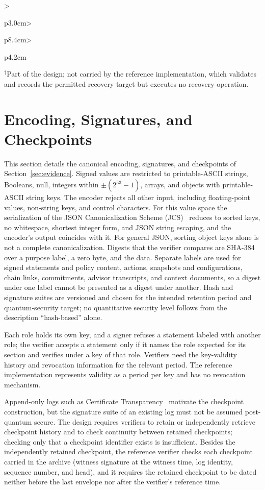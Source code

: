 \begin{table}[!t]
\begin{tabular}{>{\raggedright\arraybackslash}p{3.0cm}>{\raggedright\arraybackslash}p{8.4cm}>{\raggedright\arraybackslash}p{4.2cm}}
\bottomrule
\end{tabular}
\par\smallskip\parbox{\linewidth}{\footnotesize\raggedright $^{\dagger}$Part of the design; not carried by the reference implementation, which validates and records the permitted recovery target but executes no recovery operation.}
\end{table}

\section{Encoding, Signatures, and Checkpoints}
\label{s:chain}
This section details the canonical encoding, signatures, and checkpoints of Section~\ref{sec:evidence}. Signed values are restricted to printable-ASCII strings, Booleans, null, integers within $\pm(2^{53}-1)$, arrays, and objects with printable-ASCII string keys. The encoder rejects all other input, including floating-point values, non-string keys, and control characters. For this value space the serialization of the JSON Canonicalization Scheme (JCS)~\cite{jcs} reduces to sorted keys, no whitespace, shortest integer form, and JSON string escaping, and the encoder's output coincides with it. For general JSON, sorting object keys alone is not a complete canonicalization. Digests that the verifier compares are SHA-384 over a purpose label, a zero byte, and the data. Separate labels are used for signed statements and policy content, actions, snapshots and configurations, chain links, commitments, advisor transcripts, and context documents, so a digest under one label cannot be presented as a digest under another. Hash and signature suites are versioned and chosen for the intended retention period and quantum-security target; no quantitative security level follows from the description ``hash-based'' alone.

Each role holds its own key, and a signer refuses a statement labeled with another role; the verifier accepts a statement only if it names the role expected for its section and verifies under a key of that role. Verifiers need the key-validity history and revocation information for the relevant period. The reference implementation represents validity as a period per key and has no revocation mechanism.

Append-only logs such as Certificate Transparency~\cite{ct} motivate the checkpoint construction, but the signature suite of an existing log must not be assumed post-quantum secure. The design requires verifiers to retain or independently retrieve checkpoint history and to check continuity between retained checkpoints; checking only that a checkpoint identifier exists is insufficient. Besides the independently retained checkpoint, the reference verifier checks each checkpoint carried in the archive (witness signature at the witness time, log identity, sequence number, and head), and it requires the retained checkpoint to be dated neither before the last envelope nor after the verifier's reference time.

